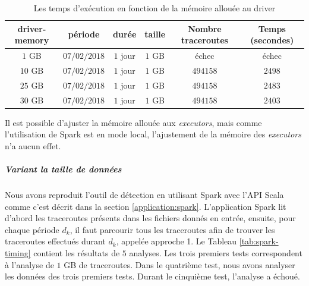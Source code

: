 \begin{table}[H]
	\captionsetup{justification=centering}
	\begin{tabular}{cccccc}
		\textbf{driver-memory}&	\textbf{période} &\textbf{durée}  & \textbf{taille}  & \textbf{Nombre traceroutes} & \textbf{Temps (secondes)}  \\ \hline
		$ 1 $ GB&	$ 07/02/2018 $&$ 1 $ jour&$ 1 $ GB& échec& échec \\ \hline 
		$ 10 $ GB&	$ 07/02/2018 $&$ 1 $ jour&$ 1 $ GB&$ 494158 $& $ 2498 $ %
		\\ \hline 
		$ 25 $ GB&	$ 07/02/2018 $&$ 1 $ jour&$ 1 $ GB&   $ 494158 $   & $ 2483 $ %
		\\ \hline
		
		$ 30 $ GB&	$ 07/02/2018 $&$ 1 $ jour&$ 1 $ GB&   $ 494158 $   & $ 2403 $ 
		\\ \hline
	
	\end{tabular}
	\caption{Les temps d'exécution en fonction de la mémoire allouée au driver }
	\label{tab:spark-timing-driver}
\end{table}


Il est possible  d'ajuster   la mémoire allouée aux \textit{executors}, mais comme l'utilisation de Spark est en mode local, l'ajustement de la mémoire des \textit{executors} n'a aucun effet. 


\subparagraph{Variant la taille de données}

Nous avons reproduit l'outil de détection en utilisant Spark avec l'API Scala comme c'est décrit dans la section \ref{application:spark}. L'application Spark lit d'abord les traceroutes présents dans les fichiers donnés en entrée, ensuite, pour chaque période $d_k$, il faut parcourir tous les  traceroutes afin de trouver les traceroutes effectués durant $d_k$, appelée approche 1.  Le Tableau \ref{tab:spark-timing} contient les résultats de $5$ analyses. Les trois premiers tests correspondent à l'analyse de $1$ GB de traceroutes. Dans le quatrième test, nous avons analyser les données des trois premiers tests. Durant le cinquième test, l'analyse a échoué. 

